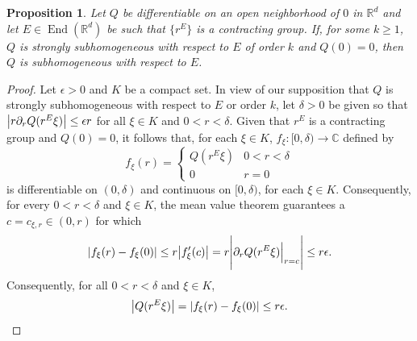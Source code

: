 \documentclass[11pt, letter]{book}
\newtheorem{proposition}[theorem]{Proposition}
\newcommand\End{\operatorname{End}} %
\begin{document}
\begin{framed}
\begin{proposition}\label{prop:supersub_implies_sub}
Let $Q$ be differentiable on an open neighborhood of $0$ in $\mathbb{R}^d$ and let $E\in\End(\mathbb{R}^d)$ be such that $\{r^E\}$ is a contracting group. If, for some $k\geq 1$, $Q$ is strongly subhomogeneous with respect to $E$ of order $k$ and $Q(0)=0$, then $Q$ is subhomogeneous with respect to $E$.
\end{proposition}
\end{framed}
\begin{proof}
Let $\epsilon>0$ and $K$ be a compact set.  In view of our supposition that $Q$ is strongly subhomogeneous with respect to $E$ or order $k$, let $\delta>0$ be given so that $\abs{r\partial_r Q(r^E\xi)}\leq \epsilon r$ for all $\xi\in K$ and $0<r< \delta$. Given that $r^E$ is a contracting group and $Q(0)=0$, it follows that, for each $\xi\in K$, $f_{\xi}:[0,\delta)\to\mathbb{C}$ defined by
\begin{equation*}
f_{\xi}(r)=\begin{cases}
Q(r^E\xi) & 0<r<\delta\\
0 & r=0
\end{cases}
\end{equation*}
is differentiable on $(0,\delta)$ and continuous on $[0,\delta)$, for each $\xi\in K$. Consequently, for every $0<r<\delta$ and $\xi\in K$, the mean value theorem guarantees a $c=c_{\xi,r}\in (0,r)$ for which 
\begin{equation*}
\abs{f_{\xi}(r)-f_{\xi}(0)}\leq r\abs{f_{\xi}'(c)}=
r\Bigg\vert\partial_r Q(r^E\xi)\Big\vert_{r=c}\Bigg\vert\leq r\epsilon.
\end{equation*}
Consequently, for all $0<r<\delta$ and $\xi\in K$,
\begin{equation*}
\abs{Q(r^E\xi)}=\abs{f_{\xi}(r)-f_{\xi}(0)}\leq r\epsilon.
\end{equation*}
\end{proof}
\end{document}

